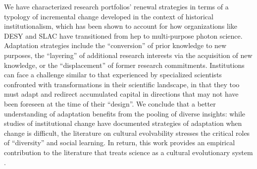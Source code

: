 \documentclass{article}
\begin{document}
We have characterized research portfolios' renewal strategies in terms of a typology of incremental change developed in the context of historical institutionalism, which has been shown to account for how organizations like DESY and SLAC have transitioned from \gls{hep} to multi-purpose photon science. Adaptation strategies include the ``conversion'' of prior knowledge to new purposes, the ``layering'' of additional research interests via the acquisition of new knowledge, or the ``displacement'' of former research commitments. Institutions can face a challenge similar to that experienced by specialized scientists confronted with transformations in their scientific landscape, in that they too must adapt and redirect accumulated capital in directions that may not have been foreseen at the time of their ``design''. We conclude that a better understanding of adaptation benefits from the pooling of diverse insights: while studies of institutional change have documented strategies of adaptation when change is difficult, the literature on cultural evolvability stresses the critical roles of ``diversity'' and social learning. In return, this work provides an empirical contribution to the literature that treats science as a cultural evolutionary system \citep{Wu2023}.



\end{document}
